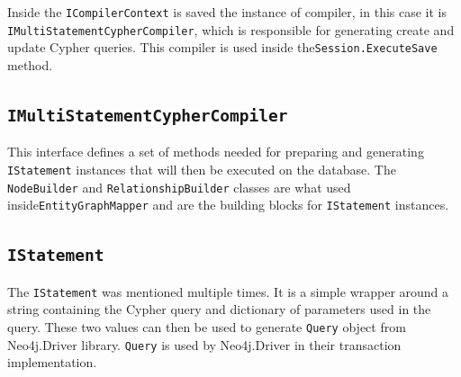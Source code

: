 Inside the \texttt{ICompilerContext} is saved the instance of compiler, in this case it is \texttt{IMultiStatementCypherCompiler},
which is responsible for generating create and update Cypher queries. This compiler is used inside the\linebreak\texttt{Session.ExecuteSave} method.

\subsection{\texttt{IMultiStatementCypherCompiler}}


This interface defines a set of methods needed for preparing and generating \texttt{IStatement} instances that will then be executed on the database.
The \texttt{NodeBuilder} and \texttt{RelationshipBuilder} classes are what used inside\linebreak\texttt{EntityGraphMapper} and are the building blocks for
\texttt{IStatement} instances.

\subsection{\texttt{IStatement}}

The \texttt{IStatement} was mentioned multiple times. It is a simple wrapper around a string containing the Cypher query and dictionary of parameters
used in the query. These two values can then be used to generate \texttt{Query} object from Neo4j.Driver library. \texttt{Query} is used by
Neo4j.Driver in their transaction implementation.


